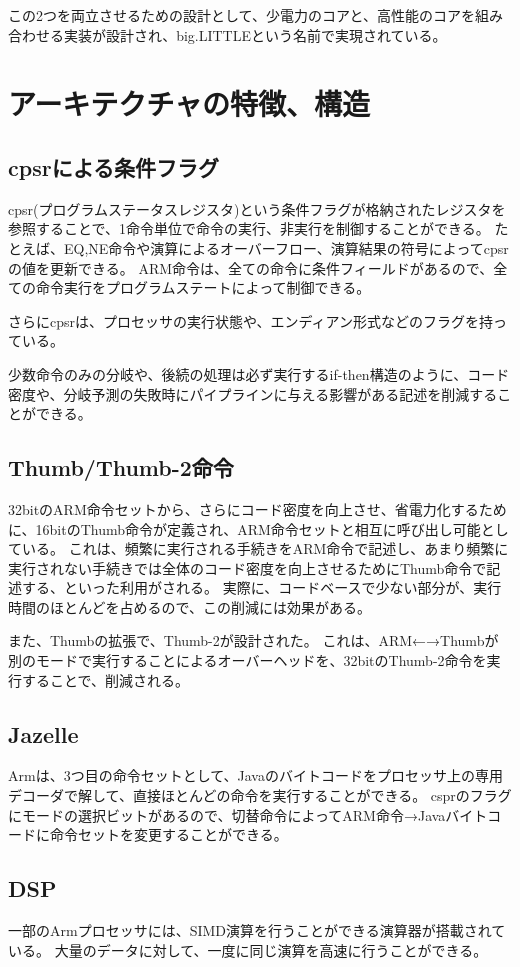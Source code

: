 \documentclass[a4paper,10pt]{jsarticle}
\begin{document}
この2つを両立させるための設計として、少電力のコアと、高性能のコアを組み合わせる実装が設計され、big.LITTLEという名前で実現されている。

\section{アーキテクチャの特徴、構造}
\subsection{cpsrによる条件フラグ}
cpsr(プログラムステータスレジスタ)という条件フラグが格納されたレジスタを参照することで、1命令単位で命令の実行、非実行を制御することができる。
たとえば、EQ,NE命令や演算によるオーバーフロー、演算結果の符号によってcpsrの値を更新できる。
ARM命令は、全ての命令に条件フィールドがあるので、全ての命令実行をプログラムステートによって制御できる。

さらにcpsrは、プロセッサの実行状態や、エンディアン形式などのフラグを持っている。

少数命令のみの分岐や、後続の処理は必ず実行するif-then構造のように、コード密度や、分岐予測の失敗時にパイプラインに与える影響がある記述を削減することができる。

\subsection{Thumb/Thumb-2命令}
32bitのARM命令セットから、さらにコード密度を向上させ、省電力化するために、16bitのThumb命令が定義され、ARM命令セットと相互に呼び出し可能としている。
これは、頻繁に実行される手続きをARM命令で記述し、あまり頻繁に実行されない手続きでは全体のコード密度を向上させるためにThumb命令で記述する、といった利用がされる。
実際に、コードベースで少ない部分が、実行時間のほとんどを占めるので、この削減には効果がある。

また、Thumbの拡張で、Thumb-2が設計された。
これは、ARM←→Thumbが別のモードで実行することによるオーバーヘッドを、32bitのThumb-2命令を実行することで、削減される。

\subsection{Jazelle}
Armは、3つ目の命令セットとして、Javaのバイトコードをプロセッサ上の専用デコーダで解して、直接ほとんどの命令を実行することができる。
csprのフラグにモードの選択ビットがあるので、切替命令によってARM命令→Javaバイトコードに命令セットを変更することができる。

\subsection{DSP}
一部のArmプロセッサには、SIMD演算を行うことができる演算器が搭載されている。
大量のデータに対して、一度に同じ演算を高速に行うことができる。
\end{document}
